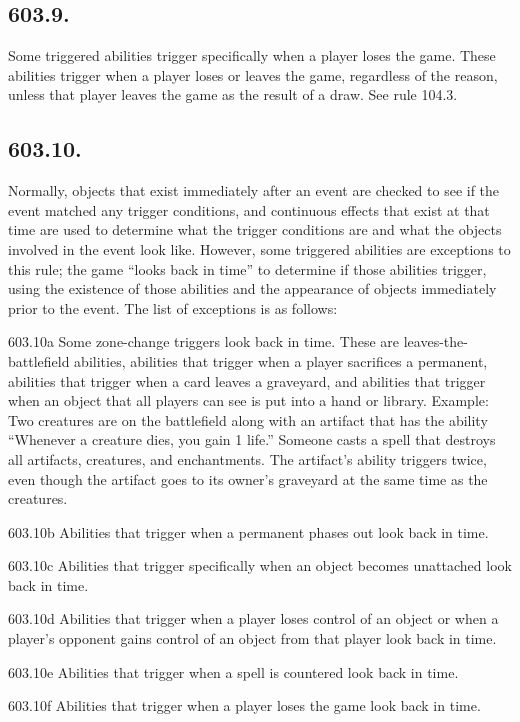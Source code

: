 \subsection*{603.9.}
Some triggered abilities trigger specifically when a player loses the game. These abilities trigger when a player loses or leaves the game, regardless of the reason, unless that player leaves the game as the result of a draw. See rule 104.3.

\subsection*{603.10.}
Normally, objects that exist immediately after an event are checked to see if the event matched any trigger conditions, and continuous effects that exist at that time are used to determine what the trigger conditions are and what the objects involved in the event look like. However, some triggered abilities are exceptions to this rule; the game “looks back in time” to determine if those abilities trigger, using the existence of those abilities and the appearance of objects immediately prior to the event. The list of exceptions is as follows:

603.10a Some zone-change triggers look back in time. These are leaves-the-battlefield abilities, abilities that trigger when a player sacrifices a permanent, abilities that trigger when a card leaves a graveyard, and abilities that trigger when an object that all players can see is put into a hand or library.
Example: Two creatures are on the battlefield along with an artifact that has the ability “Whenever a creature dies, you gain 1 life.” Someone casts a spell that destroys all artifacts, creatures, and enchantments. The artifact’s ability triggers twice, even though the artifact goes to its owner’s graveyard at the same time as the creatures.

603.10b Abilities that trigger when a permanent phases out look back in time.

603.10c Abilities that trigger specifically when an object becomes unattached look back in time.

603.10d Abilities that trigger when a player loses control of an object or when a player’s opponent gains control of an object from that player look back in time.

603.10e Abilities that trigger when a spell is countered look back in time.

603.10f Abilities that trigger when a player loses the game look back in time.

